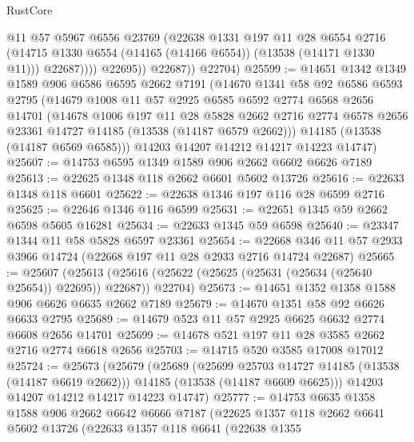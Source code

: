 \begin{lexlean}{RustCore}
\begin{coremodule}
                    @11
                    @57
                    @5967
                    @6556
                    @23769
                    (@22638
                      @1331
                      @197
                      @11
                      @28
                      @6554
                      @2716
                      (@14715 @1330 @6554 (@14165 (@14166 @6554)) (@13538 (@14171 @1330 @11)))
                      @22687))))
              @22695))
          @22687))
      @22704)
@25599 := @14651
    @1342
    @1349
    @1589
    @906
    @6586
    @6595
    @2662
    @7191
    (@14670
      @1341
      @58
      @92
      @6586
      @6593
      @2795
      (@14679
        @1008
        @11
        @57
        @2925
        @6585
        @6592
        @2774
        @6568
        @2656
        @14701
        (@14678
          @1006
          @197
          @11
          @28
          @5828
          @2662
          @2716
          @2774
          @6578
          @2656
          @23361
          @14727
          @14185
          (@13538 (@14187 @6579 @2662)))
        @14185
        (@13538 (@14187 @6569 @6585)))
      @14203
      @14207
      @14212
      @14217
      @14223
      @14747)
@25607 := @14753 @6595 @1349 @1589 @906 @2662 @6602 @6626 @7189
@25613 := @22625 @1348 @118 @2662 @6601 @5602 @13726
@25616 := @22633 @1348 @118 @6601
@25622 := @22638 @1346 @197 @116 @28 @6599 @2716
@25625 := @22646 @1346 @116 @6599
@25631 := @22651 @1345 @59 @2662 @6598 @5605 @16281
@25634 := @22633 @1345 @59 @6598
@25640 := @23347 @1344 @11 @58 @5828 @6597 @23361
@25654 := @22668 @346 @11 @57 @2933 @3966 @14724 (@22668 @197 @11 @28 @2933 @2716 @14724 @22687)
@25665 := @25607
    (@25613 (@25616 (@25622 (@25625 (@25631 (@25634 (@25640 @25654)) @22695)) @22687)) @22704)
@25673 := @14651 @1352 @1358 @1588 @906 @6626 @6635 @2662 @7189
@25679 := @14670 @1351 @58 @92 @6626 @6633 @2795
@25689 := @14679 @523 @11 @57 @2925 @6625 @6632 @2774 @6608 @2656 @14701
@25699 := @14678 @521 @197 @11 @28 @3585 @2662 @2716 @2774 @6618 @2656
@25703 := @14715 @520 @3585 @17008 @17012
@25724 := @25673
    (@25679
      (@25689
        (@25699 @25703 @14727 @14185 (@13538 (@14187 @6619 @2662)))
        @14185
        (@13538 (@14187 @6609 @6625)))
      @14203
      @14207
      @14212
      @14217
      @14223
      @14747)
@25777 := @14753
    @6635
    @1358
    @1588
    @906
    @2662
    @6642
    @6666
    @7187
    (@22625
      @1357
      @118
      @2662
      @6641
      @5602
      @13726
      (@22633
        @1357
        @118
        @6641
        (@22638
          @1355

\end{coremodule}
\end{lexlean}
